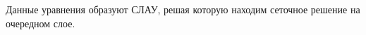 \begin{figure}[h!]
\end{figure}
\newpage
\begin{figure}[h!]
\end{figure} 
Данные уравнения образуют СЛАУ, решая которую находим сеточное решение на очередном слое.

